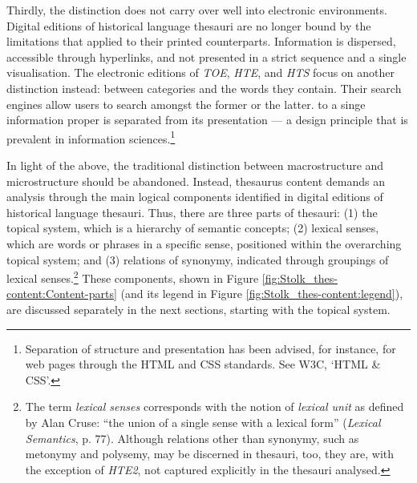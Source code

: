 Thirdly, the distinction does not carry over well into electronic environments. Digital editions of historical language thesauri are no longer bound by the limitations that applied to their printed counterparts. Information is dispersed, accessible through hyperlinks, and not presented in a strict sequence and a single visualisation. The electronic editions of \textit{TOE}, \textit{HTE}, and \textit{HTS} focus on another distinction instead: between categories and the words they contain. Their search engines allow users to search amongst the former or the latter. to a singe information proper is separated from its presentation --- a design principle that is prevalent in information sciences.\footnote{Separation of structure and presentation has been advised, for instance, for web pages through the HTML and CSS standards. See W3C, `HTML \& CSS'.}%

In light of the above, the traditional distinction between macrostructure and microstructure should be abandoned. Instead, thesaurus content demands an analysis through the main logical components identified in digital editions of historical language thesauri. Thus, there are three parts of thesauri:
(1) the topical system, which is a hierarchy of semantic concepts; (2) lexical senses, which are words or phrases in a specific sense, positioned within the overarching topical system; and (3) relations of synonymy, indicated through groupings of lexical senses.\footnote{The term \textit{lexical senses} corresponds with the notion of \textit{lexical unit} as defined by Alan Cruse: ``the  union of a single sense with a lexical form'' (\textit{Lexical Semantics}, p. 77). Although relations other than synonymy, such as metonymy and polysemy, may be discerned in thesauri, too, they are, with the exception of \textit{HTE2}, not captured explicitly in the thesauri analysed.}
These components, shown in Figure \ref{fig:Stolk_thes-content:Content-parts} (and its legend in Figure \ref{fig:Stolk_thes-content:legend}), are discussed separately in the next sections, starting with the topical system.


